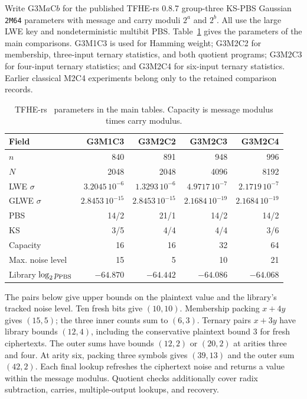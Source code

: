 \documentclass[11pt,a4paper]{article}
\begin{document}
Write G3M$a$C$b$ for the published TFHE-rs 0.8.7 group-three KS-PBS Gaussian \texttt{2M64} parameters with message and carry moduli $2^a$ and $2^b$. All use the large LWE key and nondeterministic multibit PBS. Table~\ref{tab:final-parameters} gives the parameters of the main comparisons. G3M1C3 is used for Hamming weight; G3M2C2 for membership, three-input ternary statistics, and both quotient programs; G3M2C3 for four-input ternary statistics; and G3M2C4 for six-input ternary statistics. Earlier classical M2C4 experiments belong only to the retained comparison records.

\begin{table}[H]
\centering\small
\setlength{\tabcolsep}{4pt}
\caption{TFHE-rs~\cite{TFHERs087} parameters in the main tables. Capacity is message modulus times carry modulus.}
\label{tab:final-parameters}
\begin{tabular}{lrrrr}
\toprule
Field & G3M1C3 & G3M2C2 & G3M2C3 & G3M2C4\\
\midrule
$n$ & 840 & 891 & 948 & 996\\
$N$ & 2048 & 2048 & 4096 & 8192\\
LWE $\sigma$ & $3.2045\,10^{-6}$ & $1.3293\,10^{-6}$ & $4.9717\,10^{-7}$ & $2.1719\,10^{-7}$\\
GLWE $\sigma$ & $2.8453\,10^{-15}$ & $2.8453\,10^{-15}$ & $2.1684\,10^{-19}$ & $2.1684\,10^{-19}$\\
PBS & 14/2 & 21/1 & 14/2 & 14/2\\
KS & 3/5 & 4/4 & 4/4 & 3/6\\
Capacity & 16 & 16 & 32 & 64\\
Max. noise level & 15 & 5 & 10 & 21\\
Library $\log_2p_{\rm PBS}$ & $-64.870$ & $-64.442$ & $-64.086$ & $-64.068$\\
\bottomrule
\end{tabular}
\end{table}

The pairs below give upper bounds on the plaintext value and the library's tracked noise level. Ten fresh bits give $(10,10)$. Membership packing $x+4y$ gives $(15,5)$; the three inner counts sum to $(6,3)$. Ternary pairs $x+3y$ have library bounds $(12,4)$, including the conservative plaintext bound $3$ for fresh ciphertexts. The outer sums have bounds $(12,2)$ or $(20,2)$ at arities three and four. At arity six, packing three symbols gives $(39,13)$ and the outer sum $(42,2)$. Each final lookup refreshes the ciphertext noise and returns a value within the message modulus. Quotient checks additionally cover radix subtraction, carries, multiple-output lookups, and recovery.
\end{document}
